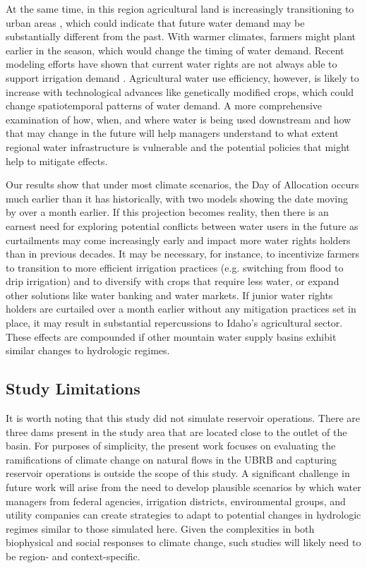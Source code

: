 \documentclass[water,article,submit,moreauthors,pdftex,10pt,a4paper]{mdpi}
\theoremstyle{mdpi}
\newcounter{ex}
\newcounter{re}
\theoremstyle{mdpidefinition}
\begin{document}
At the same time, in this region agricultural land is increasingly transitioning to urban areas \citep{Dahal:2017ux}, which could indicate that future water demand may be substantially different from the past. With warmer climates, farmers might plant earlier in the season, which would change the timing of water demand. Recent modeling efforts have shown that current water rights are not always able to support irrigation demand \citep{Han:2017tx}. Agricultural water use efficiency, however, is likely to increase with technological advances like genetically modified crops, which could change spatiotemporal patterns of water demand. A more comprehensive examination of how, when, and where water is being used downstream and how that may change in the future will help managers understand to what extent regional water infrastructure is vulnerable and the potential policies that might help to mitigate effects. 

Our results show that under most climate scenarios, the Day of Allocation occurs much earlier than it has historically, with two models showing the date moving by over a month earlier. If this projection becomes reality, then there is an earnest need for exploring potential conflicts between water users in the future as curtailments may come increasingly early and impact more water rights holders than in previous decades. It may be necessary, for instance, to incentivize farmers to transition to more efficient irrigation practices (e.g. switching from flood to drip irrigation) and to diversify with crops that require less water, or expand other solutions like water banking and water markets. If junior water rights holders are curtailed over a month earlier without any mitigation practices set in place, it may result in substantial repercussions to Idaho’s agricultural sector. These effects are compounded if other mountain water supply basins exhibit similar changes to hydrologic regimes. 

\subsection{Study Limitations}

It is worth noting that this study did not simulate reservoir operations. There are three dams present in the study area that are located close to the outlet of the basin. For purposes of simplicity, the present work focuses on evaluating the ramifications of climate change on natural flows in the UBRB and capturing reservoir operations is outside the scope of this study. A significant challenge in future work will arise from the need to develop plausible scenarios by which water managers from federal agencies, irrigation districts, environmental groups, and utility companies can create strategies to adapt to potential changes in hydrologic regimes similar to those simulated here. Given the complexities in both biophysical and social responses to climate change, such studies will likely need to be region- and context-specific.  
\end{document}
